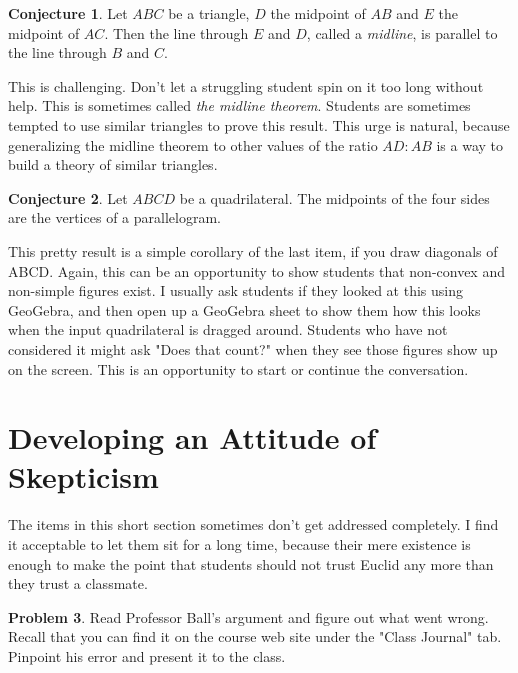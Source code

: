 \documentclass{tufte-handout}
\theoremstyle{definition}
\newtheorem{problem}{Problem}[section]
\newtheorem{conjecture}[problem]{Conjecture}
\begin{document}
\begin{conjecture}
\label{conj:midline-theorem}
Let $ABC$ be a triangle, $D$ the midpoint of $AB$ and $E$ the midpoint of $AC$.
Then the line through $E$ and $D$, called a \emph{midline}, is parallel to the line through $B$ and $C$.
\end{conjecture}

This is challenging. Don't let a struggling student spin on it too long without help. This is sometimes called \emph{the midline theorem}. Students are sometimes tempted to use similar triangles to prove this result. This urge is natural, because generalizing the midline theorem to other values of the ratio $AD:AB$ is a way to build a theory of similar triangles.



\begin{conjecture}
\label{conj:Varignon}
Let $ABCD$ be a quadrilateral. The midpoints of the four sides are the vertices of a parallelogram.
\end{conjecture}

This pretty result is a simple corollary of the last item, if you draw diagonals of ABCD. Again, this can be an opportunity to show students that non-convex and non-simple figures exist. I usually ask students if they looked at this using GeoGebra, and then open up a GeoGebra sheet to show them how this looks when the input quadrilateral is dragged around. Students who have not considered it might ask "Does that count?" when they see those figures show up on the screen. This is an opportunity to start or continue the conversation.


\clearpage
\setcounter{section}{4}
\setcounter{problem}{0}
\section{Developing an Attitude of Skepticism}

The items in this short section sometimes don't get addressed completely. I find it acceptable to let them sit for a long time, because their mere existence is enough to make the point 
that students should not trust Euclid any more than they trust a classmate.

\begin{problem}\label{prob:Ball}
Read Professor Ball's argument and figure out what went wrong.
Recall that you can find it on the course web site under the "Class Journal" tab.
Pinpoint his error and present it to the class.
\end{problem}
\end{document}

